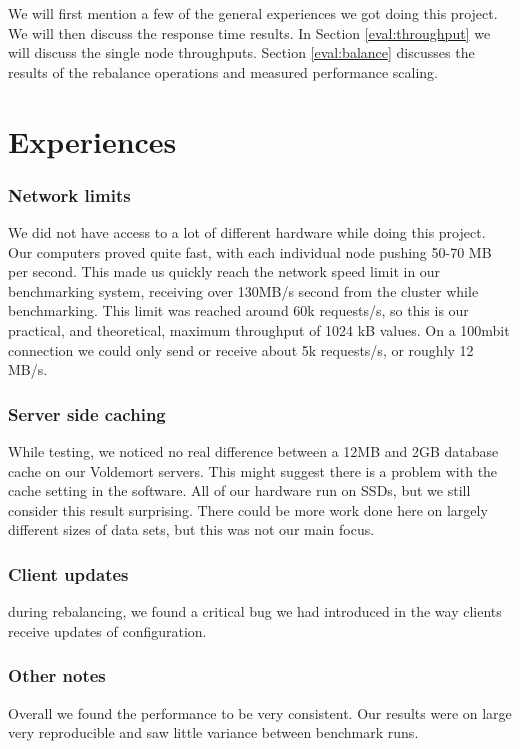 
We will first mention a few of the general experiences we got doing this project.
We will then discuss the response time results. In Section \ref{eval:throughput} we will discuss the single node throughputs.
Section \ref{eval:balance} discusses the results of the rebalance operations and measured performance scaling.

\section{Experiences}
\subsubsection{Network limits}
We did not have access to a lot of different hardware while doing this project. Our computers proved quite fast, with each individual node pushing 50-70 MB per second. This made us quickly reach the network speed limit in our benchmarking system, receiving over 130MB/s second from the cluster while benchmarking. This limit was reached around 60k requests/s, so this is our practical, and theoretical, maximum throughput of 1024 kB values. On a 100mbit connection we could only send or receive about 5k requests/s, or roughly 12 MB/s. 

\subsubsection{Server side caching}
While testing, we noticed no real difference between a 12MB and 2GB database cache on our Voldemort servers. This might suggest there is a problem with the cache setting in the software. All of our hardware run on SSDs, but we still consider this result surprising. There could be more work done here on largely different sizes of data sets, but this was not our main focus.

\subsubsection{Client updates}
during rebalancing, we found a critical bug we had introduced in the way clients receive updates of configuration.


\subsubsection{Other notes}
Overall we found the performance to be very consistent. Our results were on large very reproducible and saw little variance between benchmark runs.

